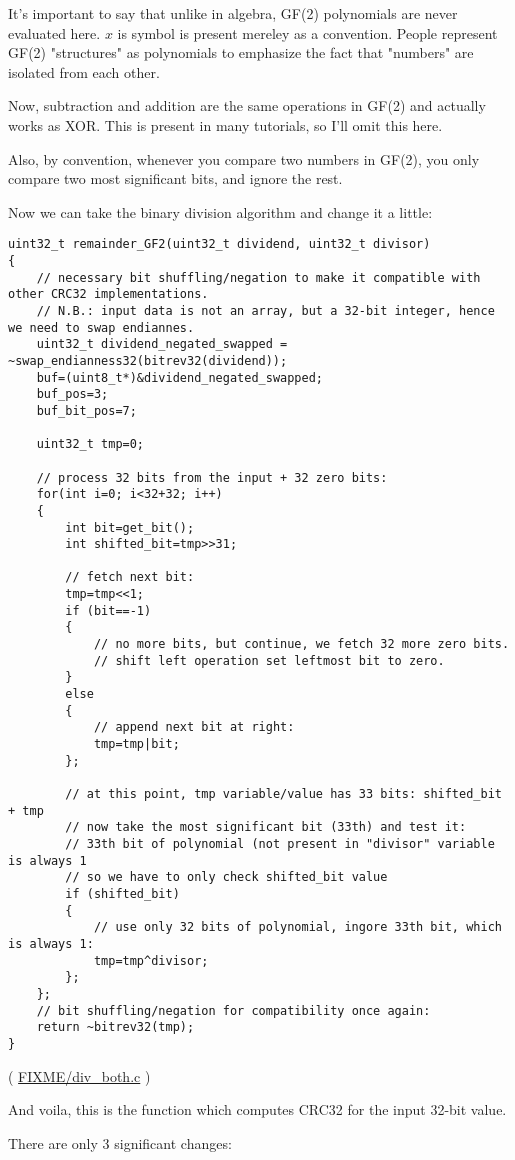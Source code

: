 It's important to say that unlike in algebra, GF(2) polynomials are never evaluated here.
$x$ is symbol is present mereley as a convention.
People represent GF(2) "structures" as polynomials to emphasize the fact that "numbers" are isolated from each other.

Now, subtraction and addition are the same operations in GF(2) and actually works as XOR.
This is present in many tutorials, so I'll omit this here.

Also, by convention, whenever you compare two numbers in GF(2), you only compare two most significant bits,
and ignore the rest.


Now we can take the binary division algorithm and change it a little:

\begin{lstlisting}[style=customc]
uint32_t remainder_GF2(uint32_t dividend, uint32_t divisor)
{
	// necessary bit shuffling/negation to make it compatible with other CRC32 implementations.
	// N.B.: input data is not an array, but a 32-bit integer, hence we need to swap endiannes.
	uint32_t dividend_negated_swapped = ~swap_endianness32(bitrev32(dividend));
	buf=(uint8_t*)&dividend_negated_swapped;
	buf_pos=3;
	buf_bit_pos=7;

	uint32_t tmp=0;

	// process 32 bits from the input + 32 zero bits:
	for(int i=0; i<32+32; i++)
	{
		int bit=get_bit();
		int shifted_bit=tmp>>31;

		// fetch next bit:
		tmp=tmp<<1;
		if (bit==-1)
		{
			// no more bits, but continue, we fetch 32 more zero bits.
			// shift left operation set leftmost bit to zero.
		}
		else
		{
			// append next bit at right:
			tmp=tmp|bit;
		};

		// at this point, tmp variable/value has 33 bits: shifted_bit + tmp
		// now take the most significant bit (33th) and test it:
		// 33th bit of polynomial (not present in "divisor" variable is always 1
		// so we have to only check shifted_bit value
		if (shifted_bit)
		{
			// use only 32 bits of polynomial, ingore 33th bit, which is always 1:
			tmp=tmp^divisor;
		};
	};
	// bit shuffling/negation for compatibility once again:
	return ~bitrev32(tmp);
}
\end{lstlisting}

( \url{FIXME/div_both.c} )

And voila, this is the function which computes CRC32 for the input 32-bit value.

There are only 3 significant changes:

